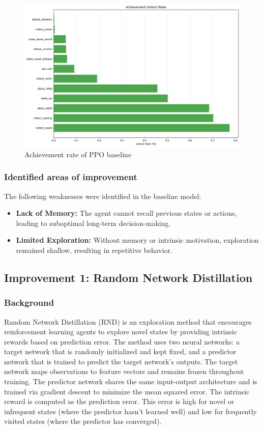 \documentclass[twocolumn]{article}
\begin{document}
\begin{figure}[H]
    \centering
    \includegraphics[width=0.75\linewidth]{images/achievement_rates_ppo_baseline_1000_episodes.png}
    \caption{Achievement rate of PPO baseline}
    \label{fig:placeholder}
\end{figure}
\subsubsection*{Identified areas of improvement}
The following weaknesses were identified in the baseline model:
\begin{itemize}
    \item \textbf{Lack of Memory:} The agent cannot recall previous states or actions, leading to suboptimal long-term decision-making.
    \item \textbf{Limited Exploration:} Without memory or intrinsic motivation, exploration remained shallow, resulting in repetitive behavior.
\end{itemize}


\subsection*{Improvement 1: Random Network Distillation}
\subsubsection*{Background}
Random Network Distillation (RND) is an exploration method that encourages reinforcement learning agents to explore novel states by providing intrinsic rewards based on prediction error. The method uses two neural networks: a target network that is randomly initialized and kept fixed, and a predictor network that is trained to predict the target network's outputs. The target network maps observations to feature vectors and remains frozen throughout training. The predictor network shares the same input-output architecture and is trained via gradient descent to minimize the mean squared error. The intrinsic reward is computed as the prediction error. This error is high for novel or infrequent states (where the predictor hasn't learned well) and low for frequently visited states (where the predictor has converged). \parencite{burda2018exploration}
\end{document}

